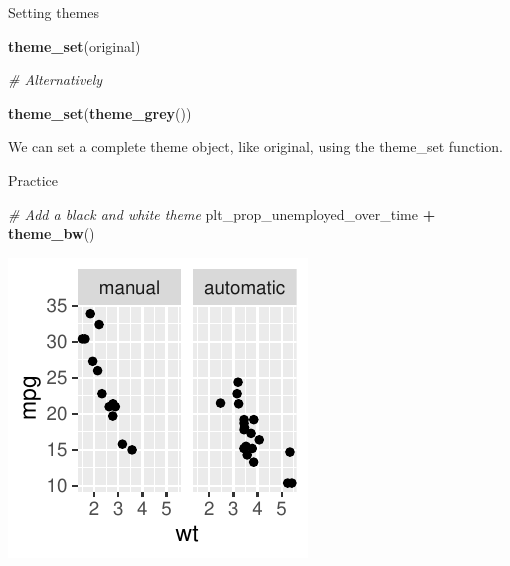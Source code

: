 \documentclass[
  ignorenonframetext,
]{beamer}
\newenvironment{Shaded}{\begin{snugshade}}{\end{snugshade}}
\newcommand{\CommentTok}[1]{\textcolor[rgb]{0.56,0.35,0.01}{\textit{#1}}}
\newcommand{\FunctionTok}[1]{\textcolor[rgb]{0.13,0.29,0.53}{\textbf{#1}}}
\newcommand{\NormalTok}[1]{#1}
\newcommand{\SpecialCharTok}[1]{\textcolor[rgb]{0.81,0.36,0.00}{\textbf{#1}}}
\begin{document}
\begin{frame}[fragile]{Setting themes}
\label{setting-themes}
\begin{Shaded}
\begin{Highlighting}[]
\FunctionTok{theme\_set}\NormalTok{(original)}

\CommentTok{\# Alternatively}

\FunctionTok{theme\_set}\NormalTok{(}\FunctionTok{theme\_grey}\NormalTok{())}
\end{Highlighting}
\end{Shaded}

We can set a complete theme object, like original, using the theme\_set
function.
\end{frame}

\begin{frame}[fragile]{Practice}
\label{practice-6}

\begin{Shaded}
\begin{Highlighting}[]
\CommentTok{\# Add a black and white theme}
\NormalTok{plt\_prop\_unemployed\_over\_time }\SpecialCharTok{+} \FunctionTok{theme\_bw}\NormalTok{()}
\end{Highlighting}
\end{Shaded}

\begin{center}\includegraphics[width=0.5\linewidth]{Figs/unnamed-chunk-87-1} \end{center}
\end{frame}
\end{document}
